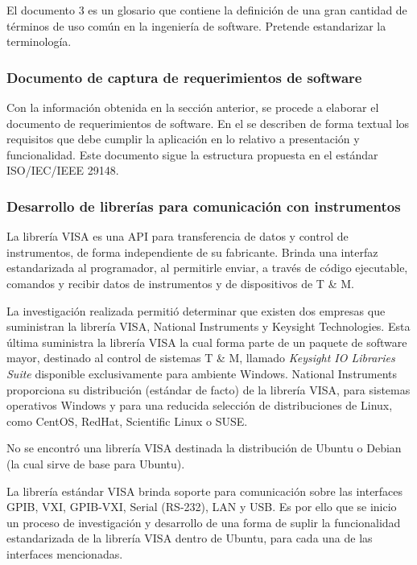 \documentclass[paper=letter,oneside,fontsize=12pt, parskip=full]{article}
\begin{document}
	El documento 3 es un glosario que contiene la definición de una gran cantidad de términos de uso común en la ingeniería de software. Pretende estandarizar la terminología.	
	
	\subsubsection{Documento de captura de requerimientos de software}
	
	Con la información obtenida en la sección anterior, se procede a elaborar el documento de requerimientos de software. En el se describen de forma textual los requisitos que debe cumplir la aplicación en lo relativo a presentación y funcionalidad. Este documento sigue la estructura propuesta en el estándar ISO/IEC/IEEE 29148.
		

	\subsubsection{Desarrollo de librerías para comunicación con instrumentos}
	
	La librería VISA es una API para transferencia de datos y control de instrumentos, de forma independiente de su fabricante. Brinda una interfaz estandarizada al programador, al permitirle enviar, a través de código ejecutable, comandos y recibir datos de instrumentos y de dispositivos de T \& M.
	 
	La investigación realizada permitió determinar que existen dos empresas que suministran la librería VISA, National Instruments y Keysight Technologies. Esta última suministra la librería VISA la cual forma parte de un paquete de software mayor, destinado al control de sistemas T \& M, llamado \emph{Keysight IO Libraries Suite} disponible exclusivamente para ambiente Windows. National Instruments proporciona su distribución (estándar de facto) de la librería VISA, para sistemas operativos Windows y para una reducida selección de distribuciones de Linux, como CentOS, RedHat, Scientific Linux o SUSE.
	
	No se encontró una librería VISA destinada la distribución de Ubuntu o Debian (la cual sirve de base para Ubuntu). 
	
	La librería estándar VISA brinda soporte para comunicación sobre las interfaces GPIB, VXI, GPIB-VXI, Serial (RS-232), LAN y USB. Es por ello que se inicio un proceso de investigación y desarrollo de una forma de suplir la funcionalidad estandarizada de la librería VISA dentro de Ubuntu, para cada una de las interfaces mencionadas.
	
\end{document}
